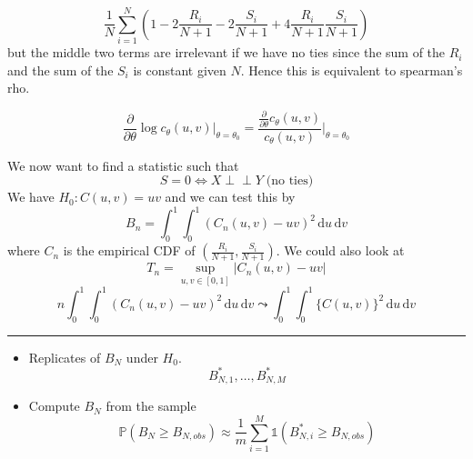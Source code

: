 \documentclass[a4paper,12pt]{amsart}
\newcommand{\sumiN}{\sum_{i=1}^N}
\newcommand{\du}{\,\mathrm{d}u}
\newcommand{\dv}{\,\mathrm{d}v}
\newcommand{\p}[1]{\mathbb{P}\left(#1\right)}
\newcommand{\indep}{\perp \!\!\! \perp}
\begin{document}
\[\frac{1}{N}\sumiN \left(1 - 2 \frac{R_i}{N+1} - 2\frac{S_i}{N+1} + 4 \frac{R_i}{N+1}\frac{S_i}{N+1}\right)\]
but the middle two terms are irrelevant if we have no ties since the sum of the $R_i$ and the sum of the $S_i$ is constant given $N$. Hence this is equivalent to spearman's rho.

\[\frac{\partial}{\partial \theta}\log c_\theta(u,v) \bigg|_{\theta = \theta_0} = \frac{\frac{\partial }{\partial \theta} c_\theta(u,v)}{c_\theta(u,v)}\bigg|_{\theta = \theta_0}\]

We now want to find a statistic such that
\[S=0 \Leftrightarrow X \indep Y \; \text{(no ties)}\]
We have $H_0: C(u,v) = uv$ and we can test this by
\[B_n = \int_0^1 \int_0^1 \! (C_n(u,v) - uv)^2 \du \dv\]
where $C_n$ is the empirical CDF of $\left(\frac{R_i}{N+1},\frac{S_i}{N+1}\right)$. We could also look at 
\[T_n = \sup_{u,v \in [0,1]}|C_n(u,v) - uv|\]
\[n\int_0^1 \int_0^1 \! (C_n(u,v) - uv)^2 \du \dv \leadsto \int_0^1 \int_0^1 \! \{C(u,v)\}^2 \du \dv\]

\bigskip
\hrule
\bigskip
\begin{itemize}
\item Replicates of $B_N$ under $H_0$. 
\[B_{N,1}^*, \ldots, B_{N,M}^*\]
\item Compute $B_N$ from the sample
\[\p{B_N \geq B_{N,obs}} \approx \frac{1}{m}\sum_{i=1}^M \mathds{1}(B_{N,i}^* \geq B_{N,obs})\]
\end{itemize}
\end{document}
